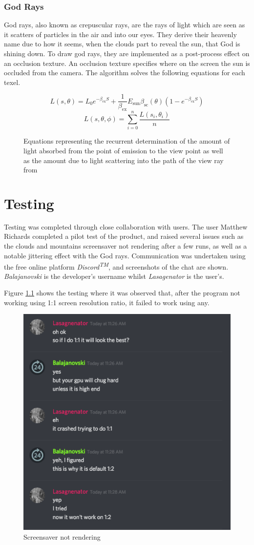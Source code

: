 \documentclass[10pt, openany]{book}
\begin{document}
\subsection{God Rays}

God rays, also known as crepuscular rays, are the rays of light which are seen as it scatters of particles in the air and into our eyes. They derive their heavenly name due to how it seems, when the clouds part to reveal the sun, that God is shining down. To draw god rays, they are implemented as a post-process effect on an occlusion texture. An occlusion texture specifies where on the screen the sun is occluded from the camera. The algorithm solves the following equations for each texel.

\begin{figure}[H]
	\centering
	\[L(s,\theta) = L_{0}e^{-\beta_{\text{ex}}S} + \frac{1}{\beta_{\text{ex}}}E_{\text{sun}}\beta_{\text{sc}}(\theta)(1-e^{-\beta_{\text{ex}}S})\]
	\[L(s,\theta,\phi) = \sum_{i=0}^{n}\frac{L(s_i,\theta_i)}{n}\]
	\caption{Equations representing the recurrent determination of the amount of light absorbed from the point of emission to the view point as well as the amount due to light scattering into the path of the view ray from \citep{gpugems3}}
\end{figure}

\chapter{Testing}

Testing was completed through close collaboration with users. The user Matthew Richards completed a pilot test of the product, and raised several issues such as the clouds and mountains screensaver not rendering after a few runs, as well as a notable jittering effect with the God rays. Communication was undertaken using the free online platform \textit{Discord\textsuperscript{TM}}, and screenshots of the chat are shown. \textit{Balajanovski} is the developer's username whilst \textit{Lasagenator} is the user's.

Figure \ref{fig:not-working} shows the testing where it was observed that, after the program not working using 1:1 screen resolution ratio, it failed to work using any.

\begin{figure}[H]
	\centering
	\includegraphics[width=0.5\linewidth]{testing1}
	\caption{Screensaver not rendering}
	\label{fig:not-working}
\end{figure}
\end{document}
